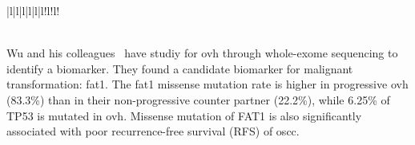 \documentclass[12pt, a4paper]{article}
\newcommand{\comm}[1]{} %
\begin{document}
{\begin{table}[!hp]
{\begin{tabular}{|l|l|l|l|l|l!{\color{black}\vrule}l!{\color{black}\vrule}l!{\color{black}\vrule}}
                                                                                                                                                                                                                                                                                                                                                                                                                                                                                                \\ 
\hline
{}                                                                                                                                                                                                                                                                                                                                                                                                    \\
\hline
\end{tabular}
}%
{}
\label{table:table4}
\end{table}

} %



Wu and his colleagues~\cite{Wu2018a} have studiy for \acrshort{ovh} through whole-exome sequencing to identify a biomarker. 
They found a candidate biomarker for malignant transformation: \acrfull{fat1}.
The \acrshort{fat1} missense mutation rate is higher in progressive \acrshort{ovh} (83.3\%) than in their non-progressive counter partner (22.2\%), while 6.25\% of TP53 is mutated in \acrshort{ovh}. 
Missense mutation of FAT1 is also significantly associated with poor recurrence-free survival (RFS) of \acrshort{oscc}.
\end{document}
